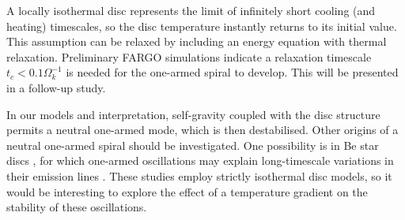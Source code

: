 A locally isothermal disc represents the limit of infinitely short
cooling (and heating) timescales, so the disc temperature instantly
returns to its initial value. %
This assumption can be relaxed by including an energy
equation with thermal relaxation. Preliminary FARGO simulations
indicate a relaxation timescale $t_c < 0.1\Omega_k^{-1}$ is needed for
the one-armed spiral to develop. This will be presented in a follow-up
study. %

In our models and interpretation, self-gravity coupled with the disc 
structure permits a neutral one-armed mode, which is then
destabilised. Other origins of a neutral
one-armed spiral should be investigated. One possibility is in Be star discs
\citep{rivinius13}, for which 
one-armed oscillations may explain long-timescale variations in their
emission lines \citep[see e.g.][and references
therein]{okasaki97,papaloizou06c,ogilvie08}. These studies employ
strictly isothermal disc models, so it would be interesting to explore
the effect of a temperature gradient on the stability of these
oscillations. 




